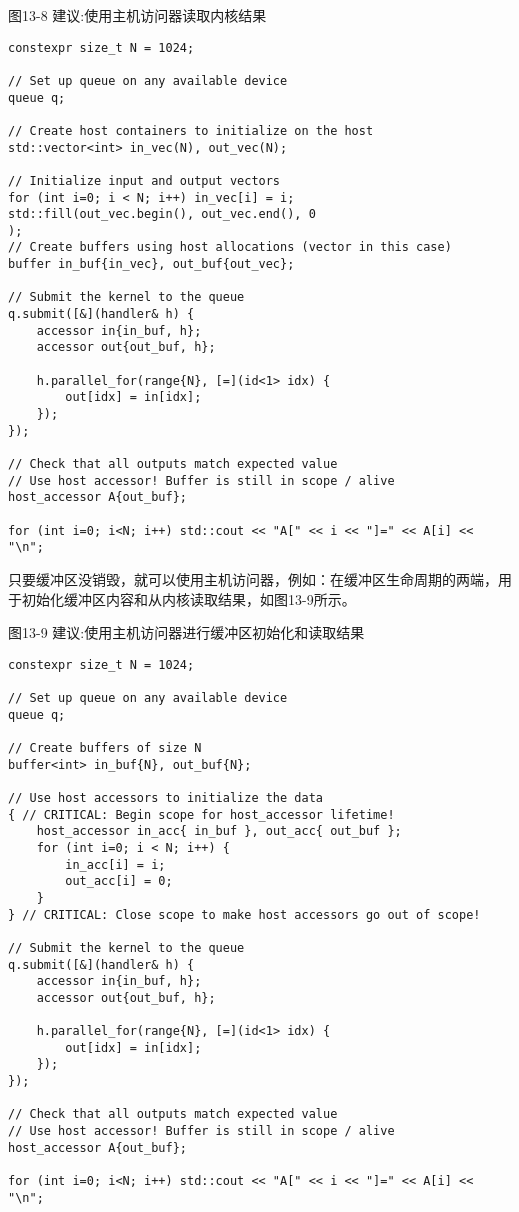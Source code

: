 \hspace*{\fill} \par %
图13-8 建议:使用主机访问器读取内核结果
\begin{lstlisting}[caption={}]
constexpr size_t N = 1024;

// Set up queue on any available device
queue q;

// Create host containers to initialize on the host
std::vector<int> in_vec(N), out_vec(N);

// Initialize input and output vectors
for (int i=0; i < N; i++) in_vec[i] = i;
std::fill(out_vec.begin(), out_vec.end(), 0
);
// Create buffers using host allocations (vector in this case)
buffer in_buf{in_vec}, out_buf{out_vec};

// Submit the kernel to the queue
q.submit([&](handler& h) {
	accessor in{in_buf, h};
	accessor out{out_buf, h};
	
	h.parallel_for(range{N}, [=](id<1> idx) {
		out[idx] = in[idx];
	});
});

// Check that all outputs match expected value
// Use host accessor! Buffer is still in scope / alive
host_accessor A{out_buf};

for (int i=0; i<N; i++) std::cout << "A[" << i << "]=" << A[i] << "\n";
\end{lstlisting}

只要缓冲区没销毁，就可以使用主机访问器，例如：在缓冲区生命周期的两端，用于初始化缓冲区内容和从内核读取结果，如图13-9所示。\par

\hspace*{\fill} \par %
图13-9 建议:使用主机访问器进行缓冲区初始化和读取结果
\begin{lstlisting}[caption={}]
constexpr size_t N = 1024;

// Set up queue on any available device
queue q;

// Create buffers of size N
buffer<int> in_buf{N}, out_buf{N};

// Use host accessors to initialize the data
{ // CRITICAL: Begin scope for host_accessor lifetime!
	host_accessor in_acc{ in_buf }, out_acc{ out_buf };
	for (int i=0; i < N; i++) {
		in_acc[i] = i;
		out_acc[i] = 0;
	}
} // CRITICAL: Close scope to make host accessors go out of scope!

// Submit the kernel to the queue
q.submit([&](handler& h) {
	accessor in{in_buf, h};
	accessor out{out_buf, h};
	
	h.parallel_for(range{N}, [=](id<1> idx) {
		out[idx] = in[idx];
	});
});

// Check that all outputs match expected value
// Use host accessor! Buffer is still in scope / alive
host_accessor A{out_buf};

for (int i=0; i<N; i++) std::cout << "A[" << i << "]=" << A[i] << "\n";
\end{lstlisting}

